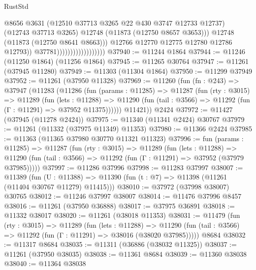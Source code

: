 \begin{lexlean}{RustStd}
\begin{coremodule}
                                                @8656
                                                @3631
                                                (@12510 @37713 @3265 @22 @430 @3747 @12733 @12737)
                                                (@12743 @37713 @3265)
                                                @12748
                                                (@11873 (@12750 @8657 @3653)))
                                              @12748
                                              (@11873 (@12750 @8641 @8663)))
                                            @12766
                                            @12770
                                            @12775
                                            @12780
                                            @12786
                                            @12793))
                                        @37781))))))))))))))))))
@37940 := @11244 @1864
@37944 := @11246 (@11250 @1864) (@11256 @1864)
@37945 := @11265 @30764
@37947 := @11261 (@37945 @11280)
@37949 := @11303 (@11304 @1864)
@37950 := @11299 @37949
@37952 := @11261 (@37950 @11328)
@37969 := @11260
    (fun (fn : @243) =>
    @37947
      (@11283
        (@11286
          (fun (params : @11285) =>
          @11287
            (fun (rty : @3015) =>
            @11289
              (fun (lets : @11288) =>
              @11290 (fun (tail : @3566) => @11292 (fun (Γ : @11291) => @37952 @11375))))))
        @11421))
    @2424
@37972 := @11427 (@37945 (@11278 @2424))
@37975 := @11340 (@11341 @2424) @30767
@37979 := @11261 (@11332 (@37975 @11349) @11353)
@37980 := @11366 @2424
@37985 := @11363 (@11365 @37980 @30770 @11321 @11323)
@37996 := fun (params : @11285) =>
  @11287
    (fun (rty : @3015) =>
    @11289
      (fun (lets : @11288) =>
      @11290 (fun (tail : @3566) => @11292 (fun (Γ : @11291) => @37952 (@37979 @37985)))))
@37997 := @11286 @37996
@37998 := @11283 @37997
@38007 := @11389
    (fun (U : @11388) => @11390 (fun (t : @7) => @11398 (@11261 (@11404 @30767 @11279) @11415)))
@38010 := @37972 (@37998 @38007) @30765
@38012 := @11246 @37997 @38007
@38014 := @11476 @37996 @8457
@38016 := @11261 (@37950 @36888)
@38017 := @37975 @36891
@38018 := @11332 @38017
@38020 := @11261 (@38018 @11353)
@38031 := @11479
    (fun (rty : @3015) =>
    @11289
      (fun (lets : @11288) =>
      @11290 (fun (tail : @3566) => @11292 (fun (Γ : @11291) => @38016 (@38020 @37985)))))
    @8684
@38032 := @11317 @8684
@38035 := @11311 (@36886 (@38032 @11325))
@38037 := @11261 (@37950 @38035)
@38038 := @11361 @8684
@38039 := @11360 @38038
@38040 := @11364 @38038

\end{coremodule}
\end{lexlean}
